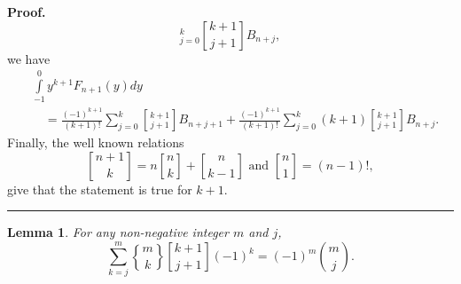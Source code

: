\documentclass{article}%
\newtheorem{lemma}[theorem]{Lemma}
\newenvironment{proof}[1][Proof]{\noindent\textbf{#1.} }{\ \rule{0.5em}{0.5em}}
\begin{document}
\begin{proof}
\[_{j=0}^{k}%
\genfrac{[}{]}{0pt}{}{k+1}{j+1}%
B_{n+j},
\]
we have%
\begin{align*}
&
{\displaystyle\int\limits_{-1}^{0}}
y^{k+1}F_{n+1}\left(  y\right)  dy\\
&  \quad=\frac{\left(  -1\right)  ^{k+1}}{\left(  k+1\right)  !}\sum_{j=0}^{k}%
\genfrac{[}{]}{0pt}{}{k+1}{j+1}%
B_{n+j+1}+\frac{\left(  -1\right)  ^{k+1}}{\left(  k+1\right)  !}\sum
_{j=0}^{k}\left(  k+1\right)
\genfrac{[}{]}{0pt}{}{k+1}{j+1}%
B_{n+j}.
\end{align*}
Finally, the well known relations
\[%
\genfrac{[}{]}{0pt}{}{n+1}{k}%
=n%
\genfrac{[}{]}{0pt}{}{n}{k}%
+%
\genfrac{[}{]}{0pt}{}{n}{k-1}%
\text{ and }%
\genfrac{[}{]}{0pt}{}{n}{1}%
=\left(  n-1\right)  !,
\]
give that the statement is true for $k+1.$
\end{proof}

\begin{lemma}
\label{lem2}For any non-negative integer $m$ and $j$,
\begin{equation}
\sum_{k=j}^{m}%
\genfrac{\{}{\}}{0pt}{}{m}{k}%
\genfrac{[}{]}{0pt}{}{k+1}{j+1}%
(-1)^{k}=(-1)^{m}\binom{m}{j}. \label{33}%
\end{equation}

\end{lemma}
\end{document}
